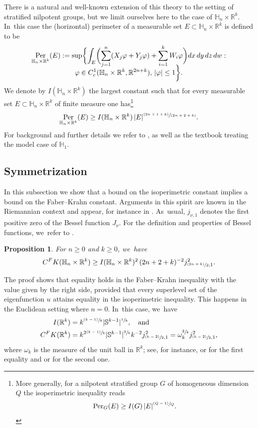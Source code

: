 \documentclass[11pt]{article}
\let\oldsfrac\sfrac
\renewcommand{\sfrac}[2]{{\oldsfrac{#1}{#2}}}
\newcommand{\psfrac}[2]{{\sfrac{(#1)}{#2}}}
\newcommand{\pspfrac}[2]{{\sfrac{(#1)}{(#2)}}}
\newcommand{\rc}{\textup{c}}
\newcommand{\FK}{\textup{FK}}
\newtheorem{proposition}[theorem]{Proposition}
\theoremstyle{definition}
\let\phi\varphi
\newcommand{\1}{\mathbbm{1}}
\newcommand{\R}{\mathbb{R}}
\newcommand{\Sph}{\mathbb{S}}
\DeclareMathOperator{\per}{Per}
\numberwithin{equation}{section}
\begin{document}
There is a natural and well-known extension of this theory to the setting of stratified nilpotent groups, but we limit ourselves here to the case of $\mathbb H_n\times\R^k$. In~this case the (horizontal) perimeter of a measurable set $E\subset\mathbb H_n\times\R^k$ is defined to be
\begin{multline*}
\per_{\mathbb H_n\times\R^k}(E):=\sup\biggl\{ \int_E \biggl(\sum_{j=1}^n (X_j\phi+Y_j\phi) + \sum_{i=1}^k W_i\phi\biggr) dx\,dy\,dz\,dw : \\[-8pt]
\phi\in C^1_\rc(\mathbb H_n\times\R^k,\R^{2n+k}),\,|\phi|\leq 1\biggr\}.
\end{multline*}
We denote by $I(\mathbb H_n\times\R^k)$ the largest constant such that for every measurable set $E\subset\mathbb H_n\times\R^k$ of finite measure one has\footnote{More generally, for a nilpotent stratified group $G$ of homogeneous dimension $Q$ the isoperimetric inequality reads
\[
\mathrm{Per}_G (E) \geq I(G)\,|E|^{\psfrac{Q-1}{Q}}.
\]
}
\[
\per_{\mathbb H_n\times\R^k} (E) \geq I(\mathbb H_n\times\R^k) \,|E|^\pspfrac{2n+1+k}{2n+2+k}.
\]
For background and further details we refer to \cite{GaNh}, as well as the textbook \cite{CaDaPaTy} treating the model case of $\mathbb H_1$.

\subsection{Symmetrization}
In this subsection we show that a bound on the isoperimetric constant implies a bound on the Faber--Krahn constant. Arguments in this spirit are known in the Riemannian context and appear, for instance in \cite[Th.\,I.1.5]{BerMe}. As~usual, $j_{\nu,1}$ denotes the first positive zero of the Bessel function $J_\nu$. For the definition and properties of Bessel functions, we~refer to \cite{AbSt}.

\begin{proposition}\label{symmetrization}
For $n\geq 0$ and $k\geq 0$, we~have
\[
C^\FK(\mathbb H_n\times\R^k) \geq I(\mathbb H_n\times\R^k)^2 \,(2n+2+k)^{-2} j_{\psfrac{2n+k}{2},1}^2.
\]
\end{proposition}

The proof shows that equality holds in the Faber--Krahn inequality with the value given by the right side, provided that every superlevel set of the eigenfunction $u$ attains equality in the isoperimetric inequality. This happens in the Euclidean setting where $n=0$. In~this case, we~have
\begin{equation}
\label{eq:isofkexplicit}
\begin{aligned}
I(\R^k) &= k^\psfrac{k-1}{k} |\Sph^{k-1}|^\sfrac1k,\quad\text{and}\\
C^\FK(\R^k)&= k^{2\psfrac{k-1}{k}} |\Sph^{k-1}|^\sfrac2k k^{-2} j_{\psfrac{k-2}{2},1}^2 = \omega_k^{\sfrac2k} j_{\psfrac{k-2}{2},1}^2,
\end{aligned}
\end{equation}
where $\omega_k$ is the measure of the unit ball in $\R^k$; see, for instance, \cite[Th.\,14.1]{Ma} or \cite{Ta} for the first equality and \cite[Th.\,2.54]{FLW} or \cite[Th.\,5.1.2]{LMP} for the second one.
\end{document}
